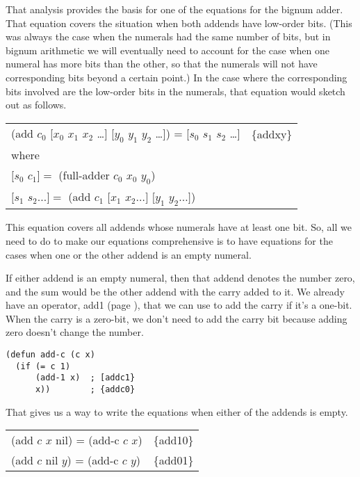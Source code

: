 That analysis provides the basis for
one of the equations for the bignum adder.
That equation covers the situation when both addends have
low-order bits. (This was always the case when
the numerals had the same number of bits, but in bignum
arithmetic we will eventually need to account for the
case when one numeral has more bits than the other,
so that the numerals will not have corresponding bits
beyond a certain point.)
In the case where the corresponding bits involved
are the low-order bits in the numerals,
that equation would sketch out as follows.

\begin{center}
\begin{tabular}{ll}
(add $c_0$ [$x_0$ $x_1$ $x_2$ \dots ] [$y_0$ $y_1$ $y_2$ \dots ]) = [$s_0$ $s_1$ $s_2$ \dots ]   & \{addxy\} \\
where & \\
$[s_0$ $c_1] =$ (full-adder $c_0$ $x_0$ $y_0$) & \\
$[s_1$ $s_2 \dots ] =$ (add $c_1$ $[x_1$ $x_2 \dots ]$ $[y_1$ $y_2 \dots ]$) & \\
\end{tabular}
\end{center}

This equation covers all addends whose numerals have at least one bit.
So, all we need to do to make our equations comprehensive
is to have equations for the cases when one or the other addend is an empty numeral.

If either addend is an empty numeral, then that addend denotes the number zero,
and the sum would be the other addend with the carry added to it.
We already have an operator, add1 (page \pageref{add-1-defun}),
that we can use to add the carry if it's a one-bit.
When the carry is a zero-bit, we don't need to add the carry bit
because adding zero doesn't change the number.

\label{add-c-defun}
\begin{Verbatim}
(defun add-c (c x)
  (if (= c 1)
      (add-1 x)  ; [addc1}
      x))        ; {addc0}
\end{Verbatim}

That gives us a way to write the equations when either of the addends is empty.
\begin{center}
\begin{tabular}{ll}
(add $c$ $x$ nil) = (add-c $c$ $x$)   & \{add10\} \\
(add $c$ nil $y$) = (add-c $c$ $y$)   & \{add01\} \\
\end{tabular}
\end{center}


